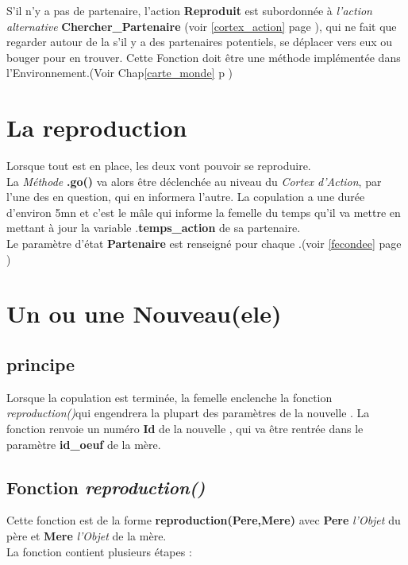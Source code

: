 \documentclass[french]{report}
\begin{document}
S'il n'y a pas de partenaire, l'action \textbf{Reproduit} est subordonnée à \textit{l'action alternative}  \textbf{Chercher\_Partenaire} (voir \ref{cortex_action} page \pageref{cortex_action}), qui ne fait que regarder autour de la \CoCiX s'il y a des partenaires potentiels, se déplacer vers eux ou bouger pour en trouver. Cette Fonction doit être une méthode implémentée dans l’Environnement.(Voir Chap\ref{carte_monde} p \pageref{carte_monde})\\

\section{La reproduction}
Lorsque tout est en place, les deux \CoCiX vont pouvoir se reproduire.\\
La \textit{Méthode} \textbf{.go()} va alors être déclenchée au niveau du \textit{Cortex d'Action}, par l'une des \CoCiX en question, qui en informera l'autre. La copulation a une durée d'environ 5mn et c'est le mâle qui informe la femelle du temps qu'il va mettre en mettant à jour la variable .\textbf{temps\_action} de sa partenaire.\\
Le paramètre d'état \textbf{Partenaire} est renseigné pour chaque \CoCiX.(voir \ref{fecondee} page \pageref{fecondee})\\

\section{Un ou une Nouveau(ele) \CoCiX}
\subsection{principe}
Lorsque la copulation est terminée, la femelle enclenche la fonction \textit{reproduction()}qui engendrera la plupart des paramètres de la nouvelle \CoCiX. La fonction renvoie un numéro \textbf{Id} de la nouvelle \CoCiX, qui va être rentrée dans le paramètre \textbf{id\_oeuf} de la mère.\\

\subsection{Fonction \textit{reproduction()}}
Cette fonction est de la forme \textbf{reproduction(Pere,Mere)} avec \textbf{Pere} \textit{l'Objet} \CoCiX du père et \textbf{Mere}  \textit{l'Objet} \CoCiX de la mère.\\
La fonction contient plusieurs étapes :
\end{document}
